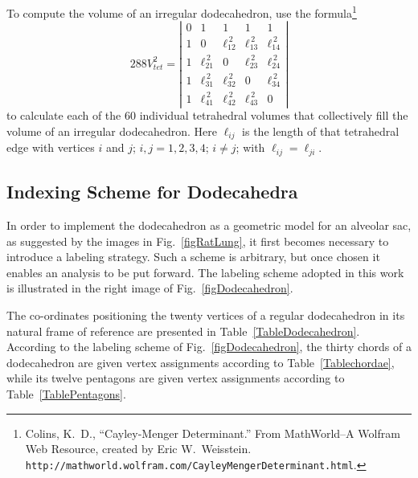 To compute the volume of an irregular dodecahedron, use the formula\footnote{
	Colins, K.~D., ``Cayley-Menger Determinant.'' From MathWorld--A Wolfram Web Resource, created by Eric W.\ Weisstein. \texttt{http://mathworld.wolfram.com/Cayley\-MengerDeterminant.html}.
}
\begin{equation}
	288 V^2_{tet} = \left| \begin{matrix}
	0 & 1 & 1 & 1 & 1 \\
	1 & 0 & \ell_{12}^{\,2} & \ell_{13}^{\,2} & \ell_{14}^{\,2} \\
	1 & \ell_{21}^{\,2} & 0 & \ell_{23}^{\,2} & \ell_{24}^{\,2} \\
	1 & \ell_{31}^{\,2} & \ell_{32}^{\,2} & 0 & \ell_{34}^{\,2} \\
	1 & \ell_{41}^{\,2} & \ell_{42}^{\,2} & \ell_{43}^{\,2} & 0
	\end{matrix} \right|
	\label{tetrahedralVolume}
\end{equation}
to calculate each of the 60 individual tetrahedral volumes that collectively fill the volume of an irregular dodecahedron.  Here $\ell_{ij}$ is the length of that tetrahedral edge with vertices $i$ and $j$; $i, j = 1, 2, 3, 4$; $i \neq j$; with $\ell_{ij} = \ell_{ji}$.

\subsection{Indexing Scheme for Dodecahedra}
\label{sec:indexingDodecahedra}

In order to implement the dodecahedron as a geometric model for an alveolar sac, as suggested by the images in Fig.~\ref{figRatLung}, it first becomes necessary to introduce a labeling strategy. Such a scheme is arbitrary, but once chosen it enables an analysis to be put forward.  The labeling scheme adopted in this work is illustrated in the right image of Fig.~\ref{figDodecahedron}. 
  
The co-ordinates positioning the twenty vertices of a regular dodecahedron in its natural frame of reference are presented in Table~\ref{TableDodecahedron}.  According to the labeling scheme of Fig.~\ref{figDodecahedron}, the thirty chords of a dodecahedron are given vertex assignments according to Table~\ref{Tablechordae}, while its twelve pentagons are given vertex assignments according to Table~\ref{TablePentagons}.

